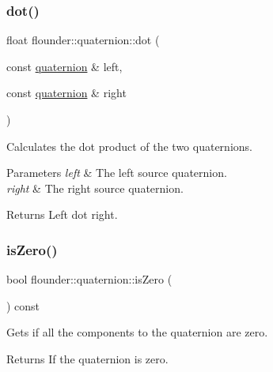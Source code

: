 \subsubsection{\texorpdfstring{dot()}{dot()}}
{\footnotesize\ttfamily float flounder\+::quaternion\+::dot (\begin{DoxyParamCaption}\item[{const \hyperlink{classflounder_1_1quaternion}{quaternion} \&}]{left,  }\item[{const \hyperlink{classflounder_1_1quaternion}{quaternion} \&}]{right }\end{DoxyParamCaption})\hspace{0.3cm}{\ttfamily [static]}}



Calculates the dot product of the two quaternions. 


\begin{DoxyParams}{Parameters}
{\em left} & The left source quaternion. \\
\hline
{\em right} & The right source quaternion. \\
\hline
\end{DoxyParams}
\begin{DoxyReturn}{Returns}
Left dot right. 
\end{DoxyReturn}
\mbox{\label{classflounder_1_1quaternion_ab42905249a14376445200771f2d9a4ca}} 
\subsubsection{\texorpdfstring{is\+Zero()}{isZero()}}
{\footnotesize\ttfamily bool flounder\+::quaternion\+::is\+Zero (\begin{DoxyParamCaption}{ }\end{DoxyParamCaption}) const}



Gets if all the components to the quaternion are zero. 

\begin{DoxyReturn}{Returns}
If the quaternion is zero. 
\end{DoxyReturn}
\mbox{\label{classflounder_1_1quaternion_a2b802d5ca0ff8a010f5b3c57a86706f8}} 

